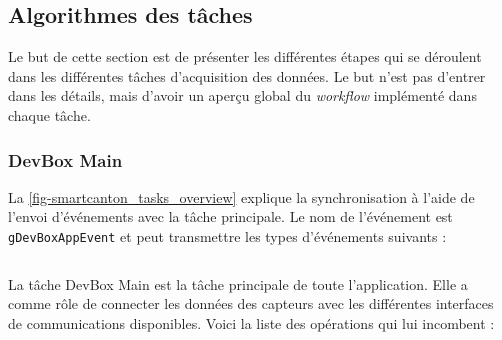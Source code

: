 \FloatBarrier
\subsection{Algorithmes des tâches}
Le but de cette section est de présenter les différentes étapes qui se déroulent dans les différentes tâches d'acquisition des données. Le but n'est pas d'entrer dans les détails, mais d'avoir un aperçu global du \textit{workflow} implémenté dans chaque tâche.


\FloatBarrier
\subsubsection{DevBox Main}

La \cref{fig-smartcanton_tasks_overview} explique la synchronisation à l'aide de l'envoi d'événements avec la tâche principale. Le nom de l'événement est \texttt{gDevBoxAppEvent} et peut transmettre les types d'événements suivants : 
\begin{tcolorbox}
  [top=-1mm, bottom=-3mm, left=0mm, right=0mm, enhanced,breakable,
  attach boxed title to top center={yshift=-3mm,yshifttext=-1mm},colback=LightGray,colframe=DarkGray,
  colbacktitle=DarkGray, fonttitle=\footnotesize\bfseries,boxed title style={size=small,colframe=DarkGray},
  title=\texttt{dev\_box\_app\_task.h} ]
\inputminted[firstline=63,lastline=93,bgcolor=LightGray,fontsize=\tiny,breaklines,linenos]{C}{SourceCode/dev_box_app_task.h}
\end{tcolorbox}

La tâche DevBox Main est la tâche principale de toute l'application. Elle a comme rôle de connecter les données des capteurs avec les différentes interfaces de communications disponibles. Voici la liste des opérations qui lui incombent : 

